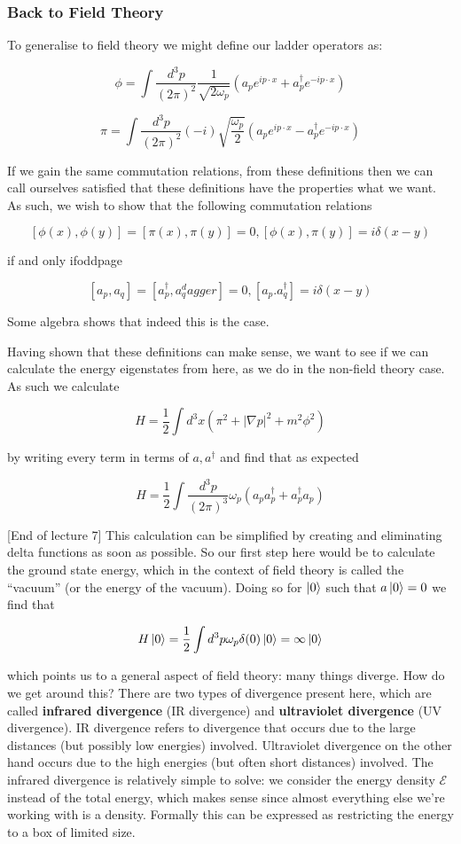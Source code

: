 \documentclass{article}
\theoremstyle{definition}
\begin{document}
\subsubsection{Back to Field Theory}

To generalise to field theory we might define our ladder operators as:

$$ \phi = \int \frac{d^3p}{(2\pi)^2} \frac{1}{\sqrt{2\omega_p}} \left( a_p
    e^{ip\cdot x} + a_p^\dagger e^{-ip \cdot x} \right) $$

$$ \pi = \int \frac{d^3p}{(2\pi)^2} (-i) \sqrt{\frac{\omega_p}{2}} \left( a_p
    e^{ip\cdot x} - a_p^\dagger e^{-ip \cdot x} \right) $$

If we gain the same commutation relations, from these definitions then we can
call ourselves satisfied that these definitions have the properties what we
want. As such, we wish to show that the following commutation relations

$$ [\phi(x), \phi(y)] = [\pi(x), \pi(y)] = 0, [\phi(x), \pi(y)] = i\delta(x -
y) $$

if and only ifoddpage

$$ [a_p, a_q] = [a_p^\dagger, a_q^dagger] = 0, [a_p. a_q^\dagger] = i\delta(x -
y) $$

Some algebra shows that indeed this is the case. 

Having shown that these definitions can make sense, we want to see if we can
calculate the energy eigenstates from here, as we do in the non-field theory
case. As such we calculate

$$ H = \frac{1}{2} \int d^3x (\pi^2 + |\nabla p|^2 + m^2 \phi^2) $$

by writing every term in terms of $a, a^\dagger$ and find that as expected

$$ H = \frac{1}{2} \int \frac{d^3p}{(2\pi)^3} \omega_p (a_p a_p^\dagger +
a_p^\dagger a_p) $$

[End of lecture 7] This calculation can be simplified by creating and eliminating delta functions
as soon as possible. So our first step here would be to calculate the ground
state energy, which in the context of field theory is called the ``vacuum'' (or
the energy of the vacuum). Doing so for $\ket{0}$ such that $a\ket{0} = 0$ we
find that

$$ H\ket{0} = \frac{1}{2} \int d^3 p \omega_p \delta(0) \ket{0} = \infty
\ket{0} $$

which points us to a general aspect of field theory: many things diverge. How do
we get around this? There are two types of divergence present here, which are
called \textbf{infrared divergence} (IR divergence) and \textbf{ultraviolet
  divergence} (UV divergence). IR divergence refers to divergence that occurs
due to the large distances (but possibly low energies) involved. Ultraviolet
divergence on the other hand occurs due to the high energies (but often short
distances) involved. The infrared divergence is relatively simple to solve: we
consider the energy density $\mathcal{E}$ instead of the total energy, which
makes sense since almost everything else we're working with is a density.
Formally this can be expressed as restricting the energy to a box of limited
size.
\end{document}
